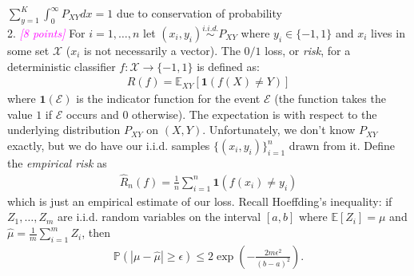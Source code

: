 \documentclass{article}
\newcommand{\1}{\mathbf{1}}
\newcommand{\E}{\mathbb{E}} %
\renewcommand{\P}{\mathbb{P}} %
\newcommand{\grade}[1]{\small\textcolor{magenta}{\emph{[#1 points]}} \normalsize}
\begin{document}
$\sum_{y=1}^K \int_0^\infty P_{XY}  dx = 1$ due to conservation of probability\\



2. \grade{8} 
For $i=1,\dots,n$ let $(x_i,y_i) \overset{i.i.d.}{\sim} P_{XY}$ where $y_i \in \{-1,1\}$ and $x_i$ lives in some set $\mathcal{X}$ ($x_i$ is not necessarily a vector). 
The $0/1$ loss, or \emph{risk}, for a deterministic classifier $f:\mathcal{X} \rightarrow \{ -1,1 \}$ is defined as:
\begin{align*}
R(f) = \mathbb E_{XY} [\1(f(X)\neq Y)]
\end{align*}
where $\1(\mathcal{E})$ is the indicator function for the event $\mathcal{E}$ (the
function takes the value $1$ if $\mathcal{E}$ occurs and $0$ otherwise).
The expectation is with respect to the underlying distribution $P_{XY}$ on $(X,Y)$.
Unfortunately, we don't know $P_{XY}$ exactly, but we do have our i.i.d. samples $\{(x_i,y_i)\}_{i=1}^n$ drawn from it.
Define the \emph{empirical risk} as 
\begin{align*}
\widehat R_n(f) = \frac{1}{n} \sum_{i=1}^n \mathbf{1}(f(x_i)\neq y_i) 
\end{align*}
which is just an empirical estimate of our loss.
Recall Hoeffding's inequality: if $Z_1,\dots,Z_m$ are i.i.d. random variables on the interval $[a,b]$ where $\E[Z_i] = \mu$ and $\widehat{\mu} = \frac{1}{m} \sum_{i=1}^m Z_i$, then 
\begin{align*}
\P\left( |\mu - \widehat{\mu}| \geq \epsilon \right) \leq 2 \exp\left(- \frac{2 m \epsilon^2}{(b-a)^2}\right).
\end{align*}
\end{document}
